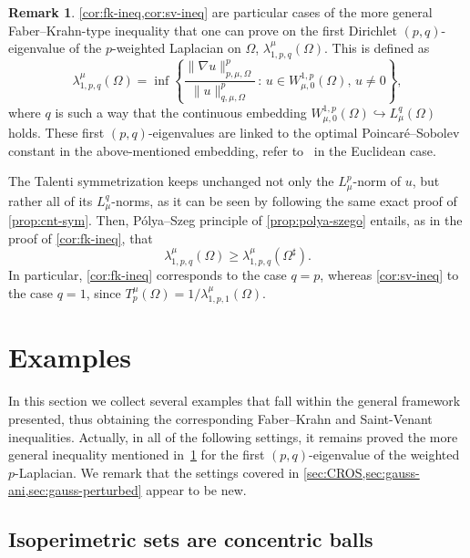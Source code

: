 \documentclass[a4paper,12pt,reqno]{amsart}
\numberwithin{equation}{section}
\renewcommand{\H}{\mathcal{H}}
\theoremstyle{plain}
\theoremstyle{definition}
\newtheorem{remark}[theorem]{Remark}
\begin{document}
\begin{remark}
\label{rem:pq-eingevalue}
%
\cref{cor:fk-ineq,cor:sv-ineq} are particular cases of the more general Faber--Krahn-type inequality that one can prove on the first Dirichlet $(p,q)$-eigenvalue of the $p$-weighted Laplacian on $\Omega$, $\lambda^\mu_{1,p,q}(\Omega)$. This is defined as
%
\[
\lambda^\mu_{1,p,q}(\Omega)
=
\inf
\left\{
\frac{\|\nabla u\|^p_{p,\mu,\Omega}}{\|u\|^{p}_{q,\mu,\Omega}} \,:\, u\in W^{1,p}_{\mu,0}(\Omega),\, u \neq 0
\right\},
\]
%
where $q$ is such a way that the continuous embedding $W^{1,p}_{\mu,0}(\Omega) \hookrightarrow L^q_\mu(\Omega)$ holds. These first $(p,q)$-eigenvalues are linked to the optimal Poincar\'e--Sobolev constant in the above-mentioned embedding, refer to~\cite{Bra14} in the Euclidean case.

The Talenti symmetrization keeps unchanged not only the $L^p_\mu$-norm of $u$, but rather all of its $L^q_\mu$-norms, as it can be seen by following the same exact proof of \cref{prop:cnt-sym}. Then, P\'olya--Szeg\H{o} principle of \cref{prop:polya-szego} entails, as in the proof of \cref{cor:fk-ineq}, that
%
\[
\lambda^\mu_{1,p,q}(\Omega) \ge \lambda^\mu_{1,p,q}(\Omega^\sharp).
\]
%
In particular, \cref{cor:fk-ineq} corresponds to the case $q=p$, whereas \cref{cor:sv-ineq} to the case $q=1$, since $T_p^\mu(\Omega) = 1/\lambda_{1,p,1}^\mu(\Omega)$.

%
\end{remark}

\section{Examples}
\label{sec:examples}

In this section we collect several examples that fall within the general framework presented, thus obtaining the corresponding Faber--Krahn and Saint-Venant inequalities. Actually, in all of the following settings, it remains proved the more general inequality mentioned in~\cref{rem:pq-eingevalue} for the first $(p,q)$-ei\-gen\-val\-ue of the weighted $p$-Laplacian. We remark that the settings covered in \cref{sec:CROS,sec:gauss-ani,sec:gauss-perturbed} appear to be new. 

\subsection{Isoperimetric sets are concentric balls}
\end{document}
